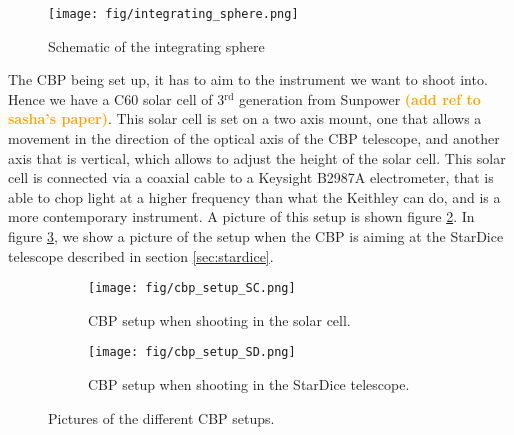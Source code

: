\documentclass[onecolumn]{aa}
\newcommand{\com}[1]{\textbf{\textcolor{orange}{(#1)}}\xspace}
\begin{document}
\begin{figure}[h]
    \centering
    \texttt{[image: fig/integrating\_sphere.png]}
    \caption{Schematic of the integrating sphere}
    \label{fig:sphere}
\end{figure}

The CBP being set up, it has to aim to the instrument we want to shoot into. Hence we have a C60 solar cell of 3$^{\mathrm{rd}}$ generation from Sunpower \com{add ref to sasha's paper}. This solar cell is set on a two axis mount, one that allows a movement in the direction of the optical axis of the CBP telescope, and another axis that is vertical, which allows to adjust the height of the solar cell. This solar cell is connected via a coaxial cable to a Keysight B2987A electrometer, that is able to chop light at a higher frequency than what the Keithley can do, and is a more contemporary instrument. A picture of this setup is shown figure \ref{fig:cbp_setup_sc}. In figure \ref{fig:cbp_setup_sd}, we show a picture of the setup when the CBP is aiming at the StarDice telescope described in section \ref{sec:stardice}.

\begin{figure}
  \begin{subfigure}[b]{0.5\textwidth}
    \texttt{[image: fig/cbp\_setup\_SC.png]}
    \caption{CBP setup when shooting in the solar cell.}
    \label{fig:cbp_setup_sc}
  \end{subfigure}
  \hfill %
  \begin{subfigure}[b]{0.5\textwidth}
    \texttt{[image: fig/cbp\_setup\_SD.png]}
    \caption{CBP setup when shooting in the StarDice telescope.}
    \label{fig:cbp_setup_sd}
  \end{subfigure}
\caption{Pictures of the different CBP setups.}
\label{fig:cbp_setup}
\end{figure}


\end{document}
